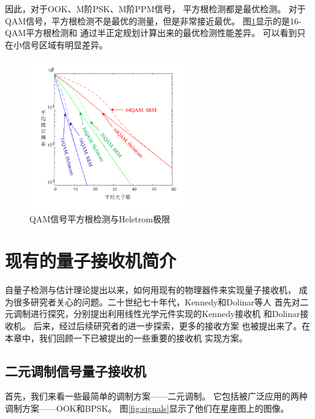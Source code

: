 因此，对于OOK、M阶PSK、M阶PPM信号，
平方根检测都是最优检测。
对于QAM信号，平方根检测不是最优的测量，但是非常接近最优。
图\ref{fig:SRM-vs-Hel}显示的是16-QAM平方根检测和
通过半正定规划计算出来的最优检测性能差异。
可以看到只在小信号区域有明显差异。

\begin{figure}
\centering
  \includegraphics[width=0.6\textwidth]{figures/chap2/QAM-SRM-vs-Helstrom}
  \caption{QAM信号平方根检测与Helstrom极限}
  \label{fig:SRM-vs-Hel}
\end{figure}


\section{现有的量子接收机简介}
自量子检测与估计理论提出以来，如何用现有的物理器件来实现量子接收机，
成为很多研究者关心的问题。二十世纪七十年代，Kennedy和Dolinar等人
首先对二元调制进行探究，分别提出利用线性光学元件实现的Kennedy接收机
和Dolinar接收机\cite{kennedy1973near,dolinar1973optimum}。
后来，经过后续研究者的进一步探索，更多的接收方案
也被提出来了。在本章中，我们回顾一下已被提出的一些重要的接收机
实现方案。
\subsection{二元调制信号量子接收机}
首先，我们来看一些最简单的调制方案——二元调制。
它包括被广泛应用的两种调制方案——OOK和BPSK。
图\ref{fig:signals}显示了他们在星座图上的图像。




